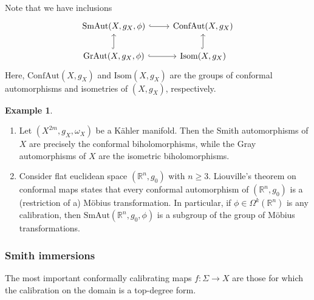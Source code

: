 \documentclass[11pt]{article}
\newcommand{\R}{\mathbb{R}}
\theoremstyle{definition}
\newtheorem{example}[thm]{Example}
\numberwithin{equation}{section}
\begin{document}
\indent Note that we have inclusions
$$\begin{tikzcd}
{\mathrm{SmAut}(X,g_X,\phi)} \arrow[r, hook]                 & {\mathrm{ConfAut}(X, g_X)}             \\
{\mathrm{GrAut}(X,g_X,\phi)} \arrow[u, hook] \arrow[r, hook] & {\mathrm{Isom}(X,g_X)} \arrow[u, hook]
\end{tikzcd}$$
Here, $\mathrm{ConfAut}(X,g_X)$ and $\mathrm{Isom}(X, g_X)$ are the groups of conformal automorphisms and isometries of $(X,g_X)$, respectively.



\begin{example} ${}$
\begin{enumerate}
\item Let $(X^{2m}, g_X, \omega_X)$ be a K\"{a}hler manifold.  Then the Smith automorphisms of $X$ are precisely the conformal biholomorphisms, while the Gray automorphisms of $X$ are the isometric biholomorphisms.
\item Consider flat euclidean space $(\R^n, g_0)$ with $n \geq 3$.  Liouville's theorem on conformal maps states that every conformal automorphism of $(\R^n, g_0)$ is a (restriction of a) M\"{o}bius transformation.  In particular, if $\phi \in \Omega^k(\R^n)$ is any calibration, then $\mathrm{SmAut}(\R^n, g_0, \phi)$ is a subgroup of the group of M\"{o}bius transformations.
\end{enumerate}
\end{example}

\subsubsection{Smith immersions}

\indent \indent The most important conformally calibrating maps $f \colon \Sigma \to X$ are those for which the calibration on the domain is a top-degree form.
\end{document}
